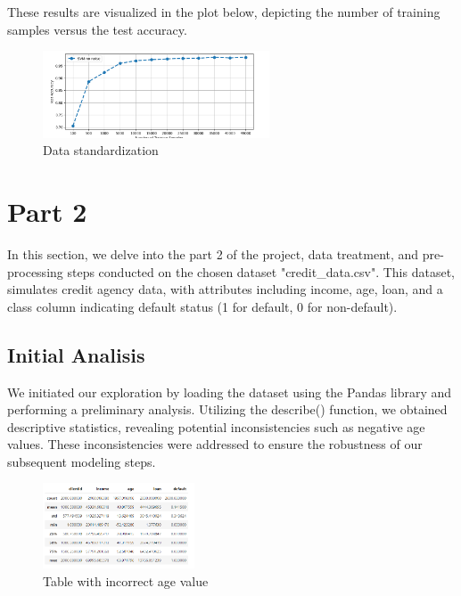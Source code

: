\documentclass{sbrt}
\begin{document}
These results are visualized in the plot below, depicting the
number of training samples versus the test accuracy.

\begin{figure}[H]
    \centering
    \includegraphics[width=0.6\textwidth]{images/complexity_curve_p1.png}
    \caption{Data standardization}
    \label{fig:example}
\end{figure}


\section{Part 2}

In this section, we delve into the part 2 of the project, data treatment, and pre-processing steps conducted on the chosen dataset "credit\_data.csv". This dataset, simulates credit agency data, with attributes including income, age, loan, and a class column indicating default status (1 for default, 0 for non-default).

\subsection{Initial Analisis}

We initiated our exploration by loading the dataset using the Pandas library and performing a preliminary analysis. Utilizing the describe() function, we obtained descriptive statistics, revealing potential inconsistencies such as negative age values. These inconsistencies were addressed to ensure the robustness of our subsequent modeling steps.

\begin{figure}[H]
    \centering
    \includegraphics[width=0.4\textwidth]{images/table_1.png}
    \caption{Table with incorrect age value}
    \label{fig:example}
\end{figure}
\end{document}
